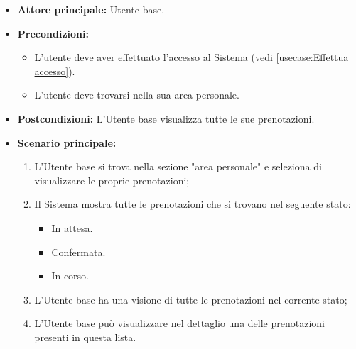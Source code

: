 \label{usecase:Visualizza prenotazioni}
\begin{itemize}
	\item \textbf{Attore principale:} Utente base.

	\item \textbf{Precondizioni:}
	\begin{itemize}
        \item L'utente deve aver effettuato l'accesso al Sistema (vedi \autoref{usecase:Effettua accesso}).
        \item L'utente deve trovarsi nella sua area personale.
    \end{itemize}

	\item \textbf{Postcondizioni:} L'Utente base visualizza tutte le sue prenotazioni.

	\item \textbf{Scenario principale:}
	      \begin{enumerate}
		      \item L'Utente base si trova nella sezione "area personale" e seleziona di visualizzare le proprie prenotazioni;
		      \item Il Sistema mostra tutte le prenotazioni che si trovano nel seguente stato:
              \begin{itemize}
                \item In attesa.
                \item Confermata.
                \item In corso.
              \end{itemize}
              \item L'Utente base ha una visione di tutte le prenotazioni nel corrente stato;
              \item L'Utente base può visualizzare nel dettaglio una delle prenotazioni presenti in questa lista.
	      \end{enumerate}
\end{itemize}
